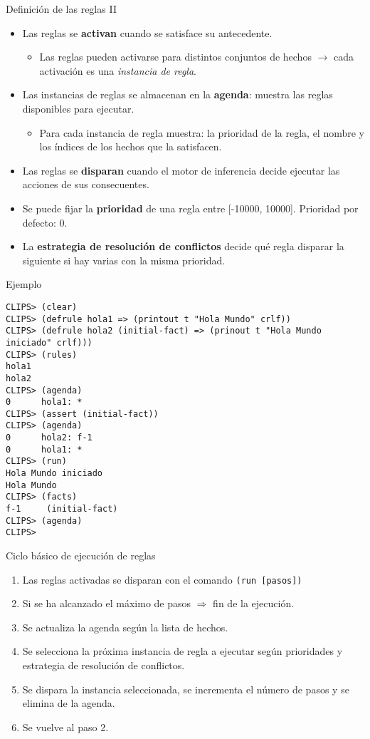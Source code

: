 \documentclass[usenames,dvipsnames,aspectratio=169]{beamer}
\begin{document}
\begin{frame}{Definición de las reglas II}
	\begin{itemize}
		\item Las reglas se \textbf{activan} cuando se satisface su antecedente.
		\begin{itemize}
			\item Las reglas pueden activarse para distintos conjuntos de hechos $\rightarrow$ cada activación es una \textit{instancia de regla}.
		\end{itemize}
		\item Las instancias de reglas se almacenan en la \textbf{agenda}: muestra las reglas disponibles para ejecutar.
		\begin{itemize}
			\item Para cada instancia de regla muestra: la prioridad de la regla, el nombre y los índices de los hechos que la satisfacen.
		\end{itemize}
		\item Las reglas se \textbf{disparan} cuando el motor de inferencia decide ejecutar las acciones de sus consecuentes.
		\item Se puede fijar la \textbf{prioridad} de una regla entre [-10000, 10000]. Prioridad por defecto: 0.
		\item La \textbf{estrategia de resolución de conflictos} decide qué regla disparar la siguiente si hay varias con la misma prioridad. 
	\end{itemize}
\end{frame}

\begin{frame}[fragile]{Ejemplo}
	\footnotesize
		\begin{verbatim}
CLIPS> (clear)
CLIPS> (defrule hola1 => (printout t "Hola Mundo" crlf))
CLIPS> (defrule hola2 (initial-fact) => (prinout t "Hola Mundo iniciado" crlf)))
CLIPS> (rules)
hola1
hola2
CLIPS> (agenda)
0      hola1: *
CLIPS> (assert (initial-fact))
CLIPS> (agenda)
0      hola2: f-1
0      hola1: *
CLIPS> (run)
Hola Mundo iniciado
Hola Mundo
CLIPS> (facts)
f-1     (initial-fact)
CLIPS> (agenda)
CLIPS>
		\end{verbatim}
\end{frame}

\begin{frame}{Ciclo básico de ejecución de reglas}
	\begin{enumerate}
		\item Las reglas activadas se disparan con el comando \texttt{(run [pasos])}
		\item Si se ha alcanzado el máximo de pasos $\Rightarrow$ fin de la ejecución.
		\item Se actualiza la agenda según la lista de hechos.
		\item Se selecciona la próxima instancia de regla a ejecutar según prioridades y estrategia de resolución de conflictos.
		\item Se dispara la instancia seleccionada, se incrementa el número de pasos y se elimina de la agenda.
		\item Se vuelve al paso 2.
	\end{enumerate}
\end{frame}
\end{document}
